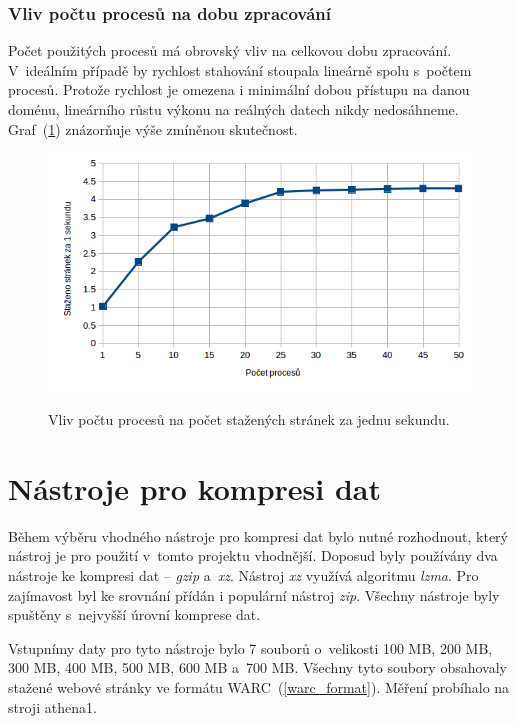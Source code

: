 \subsubsection{Vliv počtu procesů na dobu zpracování}
Počet použitých procesů má obrovský vliv na celkovou dobu zpracování.
V~ideálním případě by rychlost stahování stoupala lineárně spolu s~počtem procesů. Protože
rychlost je omezena i minimální dobou přístupu na danou doménu, lineárního růstu výkonu
na reálných datech nikdy nedosáhneme. Graf~(\ref{graph:stahovani}) znázorňuje výše
zmíněnou skutečnost.

\begin{figure}[H]
    \begin{center}
        \label{graph:stahovani}
        \includegraphics[width=1.0\textwidth]{obrazky-figures/graph_stahovani.png}
        \caption{Vliv počtu procesů na počet stažených stránek za jednu sekundu.}
    \end{center}
\end{figure}

\section{Nástroje pro kompresi dat}
Během výběru vhodného nástroje pro kompresi dat bylo nutné rozhodnout, který nástroj
je pro použití v~tomto projektu vhodnější. Doposud byly používány dva nástroje ke kompresi dat -- \textit{gzip}
a~\textit{xz}. Nástroj \textit{xz} využívá algoritmu \textit{lzma}. Pro zajímavost byl ke srovnání
přídán i populární nástroj \textit{zip}. Všechny nástroje byly spuštěny s~nejvyšší
úrovní komprese dat.

Vstupnímy daty pro tyto nástroje bylo 7 souborů o~velikosti 100 MB, 200 MB, 300 MB,
400 MB, 500 MB, 600 MB a~700 MB. Všechny tyto soubory obsahovaly stažené webové
stránky ve formátu WARC~(\ref{warc_format}). Měření probíhalo na stroji athena1.

